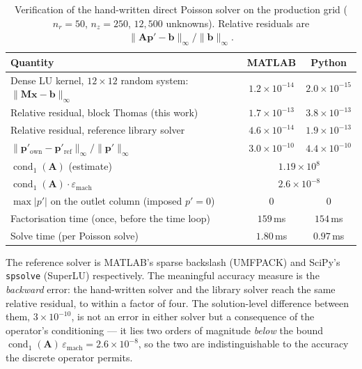\documentclass[12pt,a4paper]{article}
\begin{document}
\begin{table}[H]
\centering
\caption{Verification of the hand-written direct Poisson solver on the production grid ($n_r = 50$, $n_z = 250$, $12{,}500$ unknowns). Relative residuals are $\lVert \mathbf{A}\mathbf{p}' - \mathbf{b}\rVert_\infty / \lVert \mathbf{b} \rVert_\infty$.}
\label{tab:poisson_verify}
\begin{tabular}{lcc}
\toprule
Quantity & MATLAB & Python \\
\midrule
Dense LU kernel, $12\times12$ random system: $\lVert \mathbf{M}\mathbf{x}-\mathbf{b}\rVert_\infty$ & $1.2\times10^{-14}$ & $2.0\times10^{-15}$ \\
Relative residual, block Thomas (this work)      & $1.7\times10^{-13}$ & $3.8\times10^{-13}$ \\
Relative residual, reference library solver      & $4.6\times10^{-14}$ & $1.9\times10^{-13}$ \\
$\lVert \mathbf{p}'_{\text{own}} - \mathbf{p}'_{\text{ref}}\rVert_\infty / \lVert \mathbf{p}'\rVert_\infty$ & $3.0\times10^{-10}$ & $4.4\times10^{-10}$ \\
$\operatorname{cond}_1(\mathbf{A})$ (estimate)   & \multicolumn{2}{c}{$1.19\times10^{8}$} \\
$\operatorname{cond}_1(\mathbf{A})\cdot\varepsilon_{\text{mach}}$ & \multicolumn{2}{c}{$2.6\times10^{-8}$} \\
$\max|p'|$ on the outlet column (imposed $p'=0$) & $0$ & $0$ \\
Factorisation time (once, before the time loop)  & $159$\,ms & $154$\,ms \\
Solve time (per Poisson solve)                   & $1.80$\,ms & $0.97$\,ms \\
\bottomrule
\end{tabular}
\end{table}

The reference solver is MATLAB's sparse backslash (UMFPACK) and SciPy's \texttt{spsolve} (SuperLU) respectively.
The meaningful accuracy measure is the \emph{backward} error: the hand-written solver and the library solver reach the same relative residual, to within a factor of four.
The solution-level difference between them, $3\times10^{-10}$, is not an error in either solver but a consequence of the operator's conditioning --- it lies two orders of magnitude \emph{below} the bound $\operatorname{cond}_1(\mathbf{A})\,\varepsilon_{\text{mach}} = 2.6\times10^{-8}$, so the two are indistinguishable to the accuracy the discrete operator permits.
\end{document}
